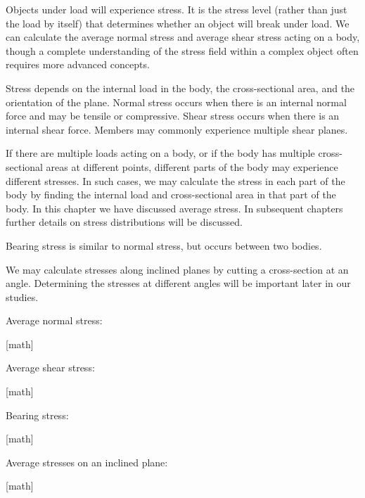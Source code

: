 \documentclass[
  letterpaper,
  DIV=11,
  numbers=noendperiod]{scrreprt}
\begin{document}
\begin{tcolorbox}[enhanced jigsaw, colback=white, colframe=quarto-callout-note-color-frame, leftrule=.75mm, opacitybacktitle=0.6, colbacktitle=quarto-callout-note-color!10!white, arc=.35mm, bottomrule=.15mm, breakable, title={Key takeaways}, left=2mm, titlerule=0mm, toptitle=1mm, toprule=.15mm, opacityback=0, rightrule=.15mm, coltitle=black, bottomtitle=1mm]

Objects under load will experience stress. It is the stress level
(rather than just the load by itself) that determines whether an object
will break under load. We can calculate the average normal stress and
average shear stress acting on a body, though a complete understanding
of the stress field within a complex object often requires more advanced
concepts.

Stress depends on the internal load in the body, the cross-sectional
area, and the orientation of the plane. Normal stress occurs when there
is an internal normal force and may be tensile or compressive. Shear
stress occurs when there is an internal shear force. Members may
commonly experience multiple shear planes.

If there are multiple loads acting on a body, or if the body has
multiple cross-sectional areas at different points, different parts of
the body may experience different stresses. In such cases, we may
calculate the stress in each part of the body by finding the internal
load and cross-sectional area in that part of the body. In this chapter
we have discussed average stress. In subsequent chapters further details
on stress distributions will be discussed.

Bearing stress is similar to normal stress, but occurs between two
bodies.

We may calculate stresses along inclined planes by cutting a
cross-section at an angle. Determining the stresses at different angles
will be important later in our studies.

\end{tcolorbox}

\begin{tcolorbox}[enhanced jigsaw, colback=white, colframe=quarto-callout-note-color-frame, leftrule=.75mm, opacitybacktitle=0.6, colbacktitle=quarto-callout-note-color!10!white, arc=.35mm, bottomrule=.15mm, breakable, title={Key equations}, left=2mm, titlerule=0mm, toptitle=1mm, toprule=.15mm, opacityback=0, rightrule=.15mm, coltitle=black, bottomtitle=1mm]

Average normal stress:

{[}math{]}

Average shear stress:

{[}math{]}

Bearing stress:

{[}math{]}

Average stresses on an inclined plane:

{[}math{]}

\end{tcolorbox}
\end{document}
